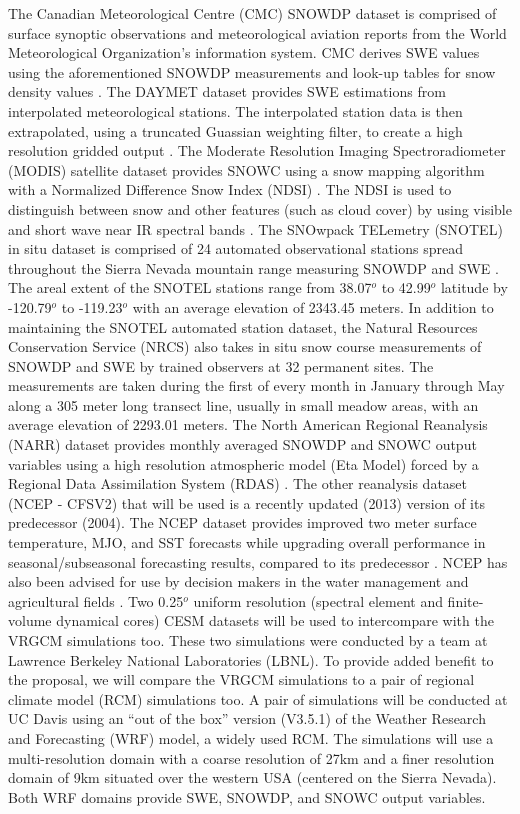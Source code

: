 \documentclass[11pt]{article}
\begin{document}
The Canadian Meteorological Centre (CMC) SNOWDP dataset is comprised of surface synoptic observations and meteorological aviation reports from the World Meteorological Organization’s information system.  CMC derives SWE values using the aforementioned SNOWDP measurements and look-up tables for snow density values \citep{brown2003gridded}.  The DAYMET dataset provides SWE estimations from interpolated meteorological stations.  The interpolated station data is then extrapolated, using a truncated Guassian weighting filter, to create a high resolution gridded output \citep{thornton2012daymet}.  The Moderate Resolution Imaging Spectroradiometer (MODIS) satellite dataset provides SNOWC using a snow mapping algorithm with a Normalized Difference Snow Index (NDSI) \citep{salomonson2006development}.  The NDSI is used to distinguish between snow and other features (such as cloud cover) by using visible and short wave near IR spectral bands \citep{salomonson2006development}.  The SNOwpack TELemetry (SNOTEL) in situ dataset is comprised of 24 automated observational stations spread throughout the Sierra Nevada mountain range measuring SNOWDP and SWE \citep{serreze1999characteristics}.  The areal extent of the SNOTEL stations range from 38.07$^{o}$ to 42.99$^{o}$ latitude by -120.79$^{o}$ to -119.23$^{o}$ with an average elevation of 2343.45 meters.  In addition to maintaining the SNOTEL automated station dataset, the Natural Resources Conservation Service (NRCS) also takes in situ snow course measurements of SNOWDP and SWE by trained observers at 32 permanent sites.  The measurements are taken during the first of every month in January through May along a 305 meter long transect line, usually in small meadow areas, with an average elevation of 2293.01 meters.  The North American Regional Reanalysis (NARR) dataset provides monthly averaged SNOWDP and SNOWC output variables using a high resolution atmospheric model (Eta Model) forced by a Regional Data Assimilation System (RDAS) \citep{mesinger2006north}.  The other reanalysis dataset (NCEP - CFSV2) that will be used is a recently updated (2013) version of its predecessor (2004).  The NCEP dataset provides improved two meter surface temperature, MJO, and SST forecasts while upgrading overall performance in seasonal/subseasonal forecasting results, compared to its predecessor \citep{saha2014ncep}. NCEP has also been advised for use by decision makers in the water management and agricultural fields \citep{saha2014ncep}.  Two 0.25$^{o}$ uniform resolution (spectral element and finite-volume dynamical cores) CESM datasets will be used to intercompare with the VRGCM simulations too.  These two simulations were conducted by a team at Lawrence Berkeley National Laboratories (LBNL). To provide added benefit to the proposal, we will compare the VRGCM simulations to a pair of regional climate model (RCM) simulations too.  A pair of simulations will be conducted at UC Davis using an “out of the box” version (V3.5.1) of the Weather Research and Forecasting (WRF) model, a widely used RCM.  The simulations will use a multi-resolution domain with a coarse resolution of 27km and a finer resolution domain of 9km situated over the western USA (centered on the Sierra Nevada).  Both WRF domains provide SWE, SNOWDP, and SNOWC output variables.
\end{document}
